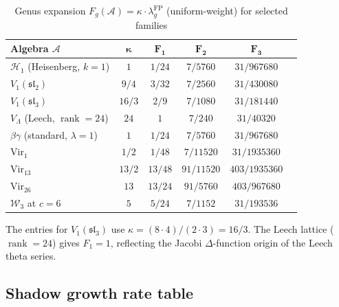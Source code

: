 \documentclass[11pt]{article}
\theoremstyle{plain}
\theoremstyle{definition}
\theoremstyle{remark}
\providecommand{\cA}{\mathcal{A}}
\providecommand{\cH}{\mathcal{H}}
\providecommand{\cW}{\mathcal{W}}
\begin{document}
\begin{table}[ht]
\centering
\caption{Genus expansion $F_g(\cA) = \kappa \cdot \lambda_g^{\mathrm{FP}}$ (uniform-weight)
for selected families}
\label{tab:genus-expansion}
\renewcommand{\arraystretch}{1.35}
{\small
\begin{tabular}{lccccc}
\toprule
\textbf{Algebra $\cA$}
 & $\boldsymbol{\kappa}$
 & $\boldsymbol{F_1}$
 & $\boldsymbol{F_2}$
 & $\boldsymbol{F_3}$ \\
\midrule
$\cH_1$ (Heisenberg, $k{=}1$)
 & $1$ & $1/24$ & $7/5760$ & $31/967680$ \\
$V_1(\mathfrak{sl}_2)$
 & $9/4$ & $3/32$ & $7/2560$ & $31/430080$ \\
$V_1(\mathfrak{sl}_3)$
 & $16/3$ & $2/9$ & $7/1080$ & $31/181440$ \\
$V_\Lambda$ (Leech, $\operatorname{rank}{=}24$)
 & $24$ & $1$ & $7/240$ & $31/40320$ \\
$\beta\gamma$ (standard, $\lambda{=}1$)
 & $1$ & $1/24$ & $7/5760$ & $31/967680$ \\
$\mathrm{Vir}_1$
 & $1/2$ & $1/48$ & $7/11520$ & $31/1935360$ \\
$\mathrm{Vir}_{13}$
 & $13/2$ & $13/48$ & $91/11520$ & $403/1935360$ \\
$\mathrm{Vir}_{26}$
 & $13$ & $13/24$ & $91/5760$ & $403/967680$ \\
$\cW_3$ at $c{=}6$
 & $5$ & $5/24$ & $7/1152$ & $31/193536$ \\
\bottomrule
\end{tabular}
}
\end{table}

\noindent
The entries for $V_1(\mathfrak{sl}_3)$ use
$\kappa = (8 \cdot 4)/(2 \cdot 3) = 16/3$. The Leech lattice
($\operatorname{rank} = 24$) gives $F_1 = 1$, reflecting the
Jacobi $\Delta$-function origin of the Leech theta series.

\subsection{Shadow growth rate table}\label{ssec:growth-rate-table}
\end{document}
